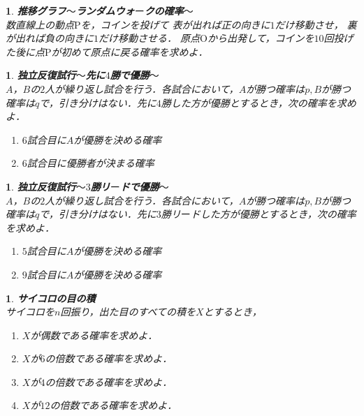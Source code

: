 \documentclass[10pt,
fleqn,
dvipdfmx,
uplatex
]{jsarticle}
\newtheorem{question}[Question]{}
\begin{document}
\begin{question}{\bf\boldmath 推移グラフ$〜$ランダムウォ$ー$クの確率$〜$}\\
数直線上の動点$\text{P}$を，コインを投げて
表が出れば正の向きに$1$だけ移動させ，
裏が出れば負の向きに$1$だけ移動させる．
原点$\text{O}$から出発して，コインを${10}$回投げた後に点$\text{P}$が初めて原点に戻る確率を求めよ．
\end{question}



\begin{question}{\bf\boldmath 独立反復試行$〜$先に$4$勝で優勝$〜$}\\
$A$，$B$の$2$人が繰り返し試合を行う．各試合において，$A$が勝つ確率は$p, B$が勝つ確率は$q$で，引き分けはない．先に$4$勝した方が優勝とするとき，次の確率を求めよ．
\begin{enumerate}
\item $6$試合目に$A$が優勝を決める確率
\item $6$試合目に優勝者が決まる確率
\end{enumerate}

\end{question}



\begin{question}{\bf\boldmath 独立反復試行$〜3$勝リ$ー$ドで優勝$〜$}\\
$A$，$B$の$2$人が繰り返し試合を行う．各試合において，$A$が勝つ確率は$p, B$が勝つ確率は$q$で，引き分けはない．先に$3$勝リ$ー$ドした方が優勝とするとき，次の確率を求めよ．
\begin{enumerate}
\item $5$試合目に$A$が優勝を決める確率
\item $9$試合目に$A$が優勝を決める確率
\end{enumerate}

\end{question}



\begin{question}{\bf\boldmath サイコロの目の積}\\
サイコロを$n$回振り，出た目のすべての積を$X$とするとき，
\begin{enumerate}
\item $X$が偶数である確率を求めよ．
\item $X$が$6$の倍数である確率を求めよ．
\item $X$が$4$の倍数である確率を求めよ．
\item $X$が${12}$の倍数である確率を求めよ．
\end{enumerate}

\end{question}
\end{document}
